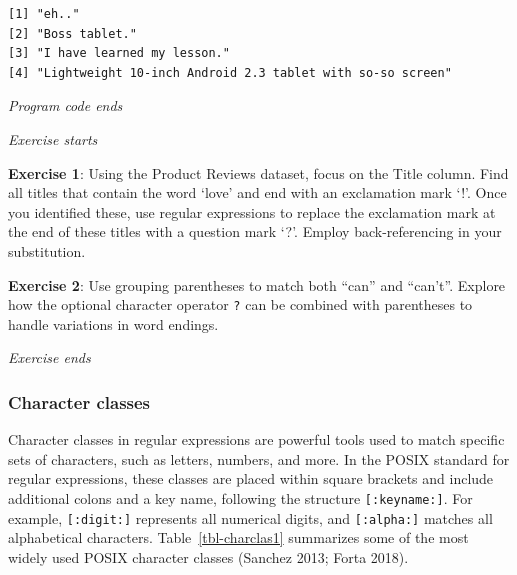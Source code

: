 \begin{verbatim}
[1] "eh.."                                                    
[2] "Boss tablet."                                            
[3] "I have learned my lesson."                               
[4] "Lightweight 10-inch Android 2.3 tablet with so-so screen"
\end{verbatim}

\emph{Program code ends}

\emph{Exercise starts}

\textbf{Exercise 1}: Using the Product Reviews dataset, focus on the
Title column. Find all titles that contain the word `love' and end
with an exclamation mark `!'. Once you identified these, use regular expressions
to replace the exclamation mark at the end of these titles with a
question mark `?'. Employ back-referencing in your substitution.

\textbf{Exercise 2}: Use grouping parentheses to match
both ``can'' and ``can't''. Explore how the optional character operator
\texttt{?} can be combined with parentheses to handle variations in word
endings.

\emph{Exercise ends}

\subsubsection{Character classes}\label{character-classes}

Character classes in regular expressions are powerful tools used to
match specific sets of characters, such as letters, numbers, and more.
In the POSIX standard for regular expressions, these classes are placed
within square brackets and include additional colons and a key name,
following the structure \texttt{{[}:keyname:{]}}. For example,
\texttt{{[}:digit:{]}} represents all numerical digits, and
\texttt{{[}:alpha:{]}} matches all alphabetical characters.
Table~\ref{tbl-charclas1} summarizes some of the most widely used POSIX
character classes (Sanchez 2013; Forta 2018).

